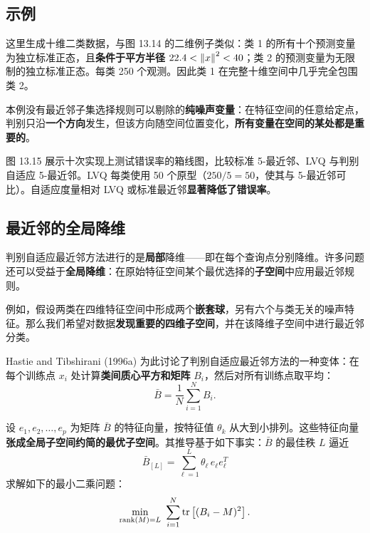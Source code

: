 \subsection{示例}

这里生成十维二类数据，与图 13.14 的二维例子类似：类 1 的所有十个预测变量为独立标准正态，且\textbf{条件于平方半径} $22.4 < \left\lVert x\right\rVert^2 < 40$；类 2 的预测变量为无限制的独立标准正态。每类 250 个观测。因此类 1 在完整十维空间中几乎完全包围类 2。

\begin{remark}[本例特点]
本例没有最近邻子集选择规则可以剔除的\textbf{纯噪声变量}：在特征空间的任意给定点，判别只沿\textbf{一个方向}发生，但该方向随空间位置变化，\textbf{所有变量在空间的某处都是重要的}。

图 13.15 展示十次实现上测试错误率的箱线图，比较标准 5-最近邻、LVQ 与判别自适应 5-最近邻。LVQ 每类使用 50 个原型（$250/5=50$，使其与 5-最近邻可比）。自适应度量相对 LVQ 或标准最近邻\textbf{显著降低了错误率}。
\end{remark}

\subsection{最近邻的全局降维}

判别自适应最近邻方法进行的是\textbf{局部}降维——即在每个查询点分别降维。许多问题还可以受益于\textbf{全局降维}：在原始特征空间某个最优选择的\textbf{子空间}中应用最近邻规则。

例如，假设两类在四维特征空间中形成两个\textbf{嵌套球}，另有六个与类无关的噪声特征。那么我们希望对数据\textbf{发现重要的四维子空间}，并在该降维子空间中进行最近邻分类。

Hastie and Tibshirani (1996a) 为此讨论了判别自适应最近邻方法的一种变体：在每个训练点 $x_i$ 处计算\textbf{类间质心平方和矩阵} $B_i$，然后对所有训练点取平均：
\begin{equation}
\bar{B} = \frac{1}{N}\sum_{i=1}^{N} B_i. \label{eq:13_10}
\end{equation}

\begin{definition}[全局最优子空间]
设 $e_1,e_2,\dots,e_p$ 为矩阵 $\bar{B}$ 的特征向量，按特征值 $\theta_k$ 从大到小排列。这些特征向量\textbf{张成全局子空间约简的最优子空间}。其推导基于如下事实：$\bar{B}$ 的最佳秩 $L$ 逼近
\begin{equation}
\bar{B}_{[L]} = \sum_{\ell=1}^{L} \theta_\ell\, e_\ell e_\ell^T
\end{equation}
求解如下的最小二乘问题：
\begin{equation}
\min_{\operatorname{rank}(M)=L}\ \sum_{i=1}^{N} \operatorname{tr}\left[(B_i - M)^2\right]. \label{eq:13_11}
\end{equation}
\end{definition}

